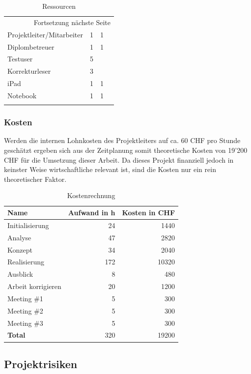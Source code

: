 \begin{landscape}
\begin{longtable}{|p{5cm}|p{3cm}|p{3cm}|p{7cm}|}
\hline
\endhead
\hline\multicolumn{4}{r}{Fortsetzung nächste Seite} \\
\endfoot
\endlastfoot
\hline
Projektleiter/Mitarbeiter & 1 & 1 & \\
Diplombetreuer & 1 & 1 & \\
Testuser & 5 &  & \\
Korrekturleser & 3 &  & \\
iPad & 1 & 1 & \\
Notebook & 1 & 1 & \\
\hline
\caption{\label{tab:orgb4a7b96}
Ressourcen}
\\
\end{longtable}
\end{landscape}

\subsubsection{Kosten}
\label{sec:org3b0553f}

Werden die internen Lohnkosten des Projektleiters auf ca. 60 CHF pro Stunde
geschätzt ergeben sich aus der Zeitplanung somit theoretische Kosten von 19'200
CHF für die Umsetzung dieser Arbeit. Da dieses Projekt finanziell jedoch in
keinster Weise wirtschaftliche relevant ist, sind die Kosten nur ein rein
theoretischer Faktor.
\begin{table}[htbp]
\centering
\begin{tabular}{lrr}
\hline
\textbf{Name}\cellcolor[HTML]{C0C0C0} & \textbf{Aufwand in h}\cellcolor[HTML]{C0C0C0} & \textbf{Kosten in CHF}\cellcolor[HTML]{C0C0C0}\\
\hline
Initialisierung & 24 & 1440\\
Analyse & 47 & 2820\\
Konzept & 34 & 2040\\
Realisierung & 172 & 10320\\
Ausblick & 8 & 480\\
Arbeit korrigieren & 20 & 1200\\
Meeting \#1 & 5 & 300\\
Meeting \#2 & 5 & 300\\
Meeting \#3 & 5 & 300\\
\hline
\textbf{Total} & 320 & 19200\\
\hline
\end{tabular}
\caption{\label{tab:org2678f20}
Kostenrechnung}

\end{table}

\subsection{Projektrisiken}
\label{sec:org2b56deb}

